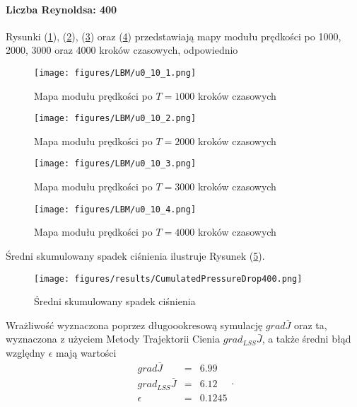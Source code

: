\documentclass[12pt]{article}
\begin{document}
\paragraph{Liczba Reynoldsa: 400}
Rysunki (\ref{Fig41}), (\ref{Fig42}), (\ref{Fig43}) oraz (\ref{Fig44}) przedstawiają mapy modułu prędkości po 1000, 2000, 3000 oraz 4000 kroków czasowych, odpowiednio 
\begin{figure}[H]
	\texttt{[image: figures/LBM/u0\_10\_1.png]} 
	\caption{Mapa modułu prędkości po $ T=1000 $ kroków czasowych}
	\label{Fig41}
\end{figure}
\begin{figure}[H]
	\texttt{[image: figures/LBM/u0\_10\_2.png]} 
	\caption{Mapa modułu prędkości po $ T=2000 $ kroków czasowych}
	\label{Fig42}
\end{figure}
\begin{figure}[H]
	\texttt{[image: figures/LBM/u0\_10\_3.png]} 
	\caption{Mapa modułu prędkości po $ T=3000 $ kroków czasowych}
	\label{Fig43}
\end{figure}
\begin{figure}[H]
	\texttt{[image: figures/LBM/u0\_10\_4.png]} 
	\caption{Mapa modułu prędkości po $ T=4000 $ kroków czasowych}
	\label{Fig44}
\end{figure}
Średni skumulowany spadek ciśnienia ilustruje Rysunek (\ref{Fig45}).
\begin{figure}[H]
	\texttt{[image: figures/results/CumulatedPressureDrop400.png]} 
	\centering
	\caption{Średni skumulowany spadek ciśnienia}
	\label{Fig45}
\end{figure}
Wrażliwość wyznaczona poprzez długoookresową symulację $ grad\bar{J} $ oraz ta, wyznaczona z użyciem Metody Trajektorii Cienia $ grad_{LSS}\bar{J} $, a także średni błąd względny $ \epsilon $ mają wartości
\begin{equation}
\begin{array}{rcl}
grad\bar{J} &=& 6.99 \\
grad_{LSS}\bar{J} &=& 6.12 \\
\epsilon &=& 0.1245
\end{array} .
\label{result400}
\end{equation}
\end{document}
